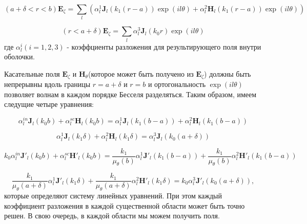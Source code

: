 \documentclass[a4paper, 12pt]{article}
\begin{document}
\begin{equation}\label{e10}
	(a+\delta<r<b)\mathbf{E}_\zeta = \sum\limits_l (\alpha_l^{1} \mathbf{J}_l(k_1 (r-a))\exp(il\theta) +
								\alpha_l^{2} \mathbf{H}_l(k_1 (r-a))\exp(il\theta))
\end{equation}

\begin{equation*}
	(r<a+\delta)\mathbf{E}_\zeta = \sum\limits_l \alpha_l^{3} \mathbf{J}_l(k_0 r)\exp(il\theta)
\end{equation*}
где $\alpha_l^i(i=1,2,3)$ - коэффциенты разложения для результирующего поля внутри оболочки.

Касательные поля $\mathbf{E}_\zeta$ и $\mathbf{H}_\theta$(которое может быть получено из $\mathbf{E}_\zeta$)
должны быть непрерывны вдоль границы $r=a+\delta$ и $r=b$ и ортогональность $\exp(il\theta)$ позволяет волнам
в каждом порядке Бесселя разделяться. Таким образом, имеем следущие четыре уравнения:

\begin{equation}\tag{11a}\label{e11a}
	\alpha_l^{in} \mathbf{J}_l(k_0 b) + \alpha_l^{sc} \mathbf{H}_l(k_0 b) = 
	\alpha_l^1 \mathbf{J}_l(k_1(b-a)) + \alpha_l^2 \mathbf{H}_l(k_1(b-a)) 	
\end{equation}

\begin{equation}\tag{11b}\label{e11b}
	\alpha_l^1 \mathbf{J}_l(k_1 \delta) + \alpha_l^2 \mathbf{H}_l(k_1 \delta) = \alpha_l^3 \mathbf{J}_l(k_0(a+\delta)) 
\end{equation}

\begin{equation}\tag{11c}\label{e11c}
	k_0\alpha_l^{in} \mathbf{J}'_l(k_0 b) + \alpha_l^{sc} \mathbf{H'}_l(k_0 b)	=
	\frac{k_1}{\mu_\theta(b)} \alpha_l^1 \mathbf{J'}_l(k_1(b-a)) + \frac{k_1}{\mu_\theta(b)} \alpha_l^2 \mathbf{H'}_l
	(k_1(b-a)) 	
\end{equation}

\begin{equation}\tag{11d}\label{e11d}
	\frac{k_1}{\mu_\theta(a+\delta)}\alpha_l^1 \mathbf{J'}_l(k_1 \delta) + \frac{k_1}{\mu_\theta(a+\delta)}
	\alpha_l^2 \mathbf{H'}_l(k_1 \delta) = k_0\alpha_l^3 \mathbf{J'}_l(k_0(a+\delta)),
\end{equation}
которые определяют систему линейных уравнений. При этом каждый коэффициент разложения в каждой существенной области может быть точно решен.
В свою очередь, в каждой области мы можем получить поля.
\end{document}
